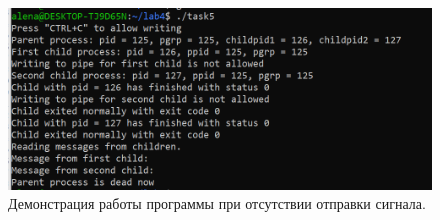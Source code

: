 \documentclass[12pt]{report}
\begin{document}
\begin{figure}[H]
	
	\centering
	
	\includegraphics[width=\linewidth]{img/task05_02.png}
	\caption{Демонстрация работы программы при отсутствии отправки сигнала.}
	
	\label{fig:task05_01}
	
\end{figure}



\end{document}
